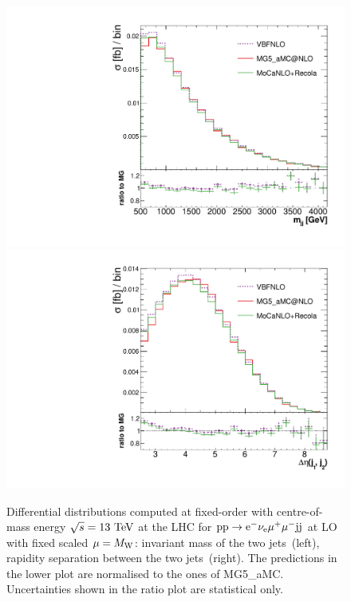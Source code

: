 \documentclass[11pt]{cernrep}
\begin{document}
\begin{figure}[htbp]
\begin{center}
   \includegraphics[scale=0.375]{figs/mjj_FixedOrder.pdf}
   \includegraphics[scale=0.375]{figs/dEtajj_FixedOrder.pdf}
\caption{Differential distributions computed at fixed-order with centre-of-mass energy $\sqrt{s}=13{\rm~TeV}$ at the LHC for ${\rm p} {\rm p}
  \to {\rm e}^-  \nu_{\rm e}  \mu^+ \mu^- {\rm j} {\rm j}$ at LO with fixed scaled $\mu = M_{\rm W}$: 
                invariant mass of the two jets~(left),
                rapidity separation between the two jets~(right).
                The predictions in the lower plot are normalised to the ones of {\sc MG5\_aMC}. Uncertainties
                shown in the ratio plot are statistical only.
                }
\label{vbs_fig_fixed_order}
\end{center}
\end{figure}
\end{document}
